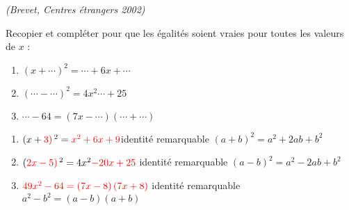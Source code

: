 
\textit{(Brevet, Centres étrangers 2002)}
\par
Recopier et compléter pour que les égalités soient vraies pour toutes les valeurs de $x$ :
\begin{enumerate}
     \item
     $\left(x+\cdots\right)^{2} = \cdots + 6x + \cdots$
     \item
     $\left(\cdots-\cdots\right)^{2} = 4x^{2} \cdots + 25$
     \item
     $\cdots-64 = \left(7x-\cdots\right)\left( \cdots + \cdots\right)$
\end{enumerate}
\begin{corrige}
     \begin{enumerate}
          \item
          $\left(x+\color{red}{3}\right)^{2} = \color{red}{x^{2}} + 6x + \color{red}{9}   $identité remarquable $\left(a+b\right)^{2}=a^{2}+2ab+b^{2}$
          \item
          $\left(\color{red}{2x}-\color{red}{5}\right)^{2} = 4x^{2} \color{red}{-} \color{red}{20x} + 25    $ identité remarquable $\left(a-b\right)^{2}=a^{2}-2ab+b^{2}$
          \item
          $\color{red}{49x^{2}}-64 = \left(7x-\color{red}{8}\right)\left(\color{red}{7x} + \color{red}{8}\right)   $ identité remarquable $a^{2}-b^{2} = \left(a-b\right)\left(a+b\right)$
     \end{enumerate}
\end{corrige}


